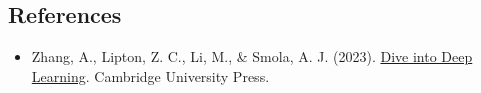 \FloatBarrier
{}
\hypertarget{references-7}{%
\subsection{References}\label{references-7}}

\vspace{0.25em}
\begin{itemize}
\tightlist
\item
  Zhang, A., Lipton, Z. C., Li, M., \& Smola, A. J. (2023). \href{https://D2L.ai}{Dive into Deep Learning}. Cambridge University Press.
\end{itemize}

\clearpage
